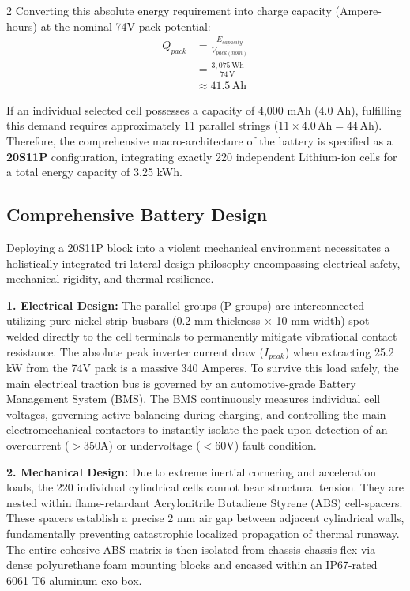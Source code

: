 \begin{multicols}{2}
Converting this absolute energy requirement into charge capacity (Ampere-hours) at the nominal 74V pack potential:
\begin{equation} \label{eq:ah_capacity}
\begin{split}
Q_{pack} &= \frac{E_{capacity}}{V_{pack(nom)}} \\
&= \frac{3,075\,\mathrm{Wh}}{74\,\mathrm{V}} \\
&\approx 41.5\,\mathrm{Ah}
\end{split}
\end{equation}

If an individual selected cell possesses a capacity of 4,000 mAh (4.0 Ah), fulfilling this demand requires approximately 11 parallel strings ($11 \times 4.0\,\mathrm{Ah} = 44\,\mathrm{Ah}$). Therefore, the comprehensive macro-architecture of the battery is specified as a \textbf{20S11P} configuration, integrating exactly 220 independent Lithium-ion cells for a total energy capacity of 3.25 kWh.

\subsection{Comprehensive Battery Design}

Deploying a 20S11P block into a violent mechanical environment necessitates a holistically integrated tri-lateral design philosophy encompassing electrical safety, mechanical rigidity, and thermal resilience.

\textbf{1. Electrical Design:}
The parallel groups (P-groups) are interconnected utilizing pure nickel strip busbars (0.2 mm thickness $\times$ 10 mm width) spot-welded directly to the cell terminals to permanently mitigate vibrational contact resistance. The absolute peak inverter current draw ($I_{peak}$) when extracting 25.2 kW from the 74V pack is a massive 340 Amperes. To survive this load safely, the main electrical traction bus is governed by an automotive-grade Battery Management System (BMS). The BMS continuously measures individual cell voltages, governing active balancing during charging, and controlling the main electromechanical contactors to instantly isolate the pack upon detection of an overcurrent ($>350$A) or undervoltage ($<60$V) fault condition.

\textbf{2. Mechanical Design:}
Due to extreme inertial cornering and acceleration loads, the 220 individual cylindrical cells cannot bear structural tension. They are nested within flame-retardant Acrylonitrile Butadiene Styrene (ABS) cell-spacers. These spacers establish a precise 2 mm air gap between adjacent cylindrical walls, fundamentally preventing catastrophic localized propagation of thermal runaway. The entire cohesive ABS matrix is then isolated from chassis chassis flex via dense polyurethane foam mounting blocks and encased within an IP67-rated 6061-T6 aluminum exo-box.


\end{multicols}
